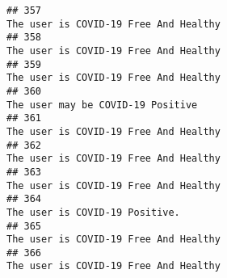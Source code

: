 \documentclass[
]{article}
\begin{document}
\begin{verbatim}
## 357                                                                                                                                                                                                                              The user is COVID-19 Free And Healthy
## 358                                                                                                                                                                                                                              The user is COVID-19 Free And Healthy
## 359                                                                                                                                                                                                                              The user is COVID-19 Free And Healthy
## 360                                                                                                                                                                                                                                  The user may be COVID-19 Positive
## 361                                                                                                                                                                                                                              The user is COVID-19 Free And Healthy
## 362                                                                                                                                                                                                                              The user is COVID-19 Free And Healthy
## 363                                                                                                                                                                                                                              The user is COVID-19 Free And Healthy
## 364                                                                                                                                                                                                                                     The user is COVID-19 Positive.
## 365                                                                                                                                                                                                                              The user is COVID-19 Free And Healthy
## 366                                                                                                                                                                                                                              The user is COVID-19 Free And Healthy

\end{verbatim}
\end{document}
